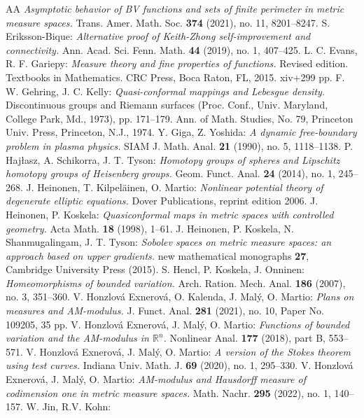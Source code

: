\documentclass[11pt, letterpaper]{amsart} %
\newcommand*{\R}{{\mathbb R}}
\numberwithin{equation}{section}
\theoremstyle{plain}
\theoremstyle{definition}
\begin{document}
{\begin{thebibliography}{AA}
\emph{Asymptotic behavior of BV functions and sets of finite perimeter in metric measure spaces.}
Trans. Amer. Math. Soc. {\bf 374} (2021), no. 11, 8201--8247.
 S. Eriksson-Bique:
\emph{Alternative proof of Keith-Zhong self-improvement and connectivity.}
Ann. Acad. Sci. Fenn. Math. {\bf 44} (2019), no. 1, 407--425.
 L. C. Evans, R. F. Gariepy:
\emph{Measure theory and fine properties of functions.}
Revised edition. Textbooks in Mathematics. CRC Press, Boca Raton, FL, 2015. xiv+299 pp.
 F. W. Gehring, J. C. Kelly:
\emph{Quasi-conformal mappings and Lebesgue density.}
Discontinuous groups and Riemann surfaces (Proc. Conf., Univ. Maryland, College Park, Md., 1973), pp. 171--179.
Ann. of Math. Studies, No. 79, Princeton Univ. Press, Princeton, N.J., 1974. 
 Y. Giga, Z. Yoshida:
\emph{A dynamic free-boundary problem in plasma physics.}
SIAM J. Math. Anal. {\bf 21} (1990), no. 5, 1118--1138. 
 P. Haj\l asz, A. Schikorra, J. T. Tyson:
\emph{Homotopy groups of spheres and Lipschitz homotopy groups of Heisenberg groups.}
Geom. Funct. Anal. {\bf 24} (2014), no. 1, 245--268. 
 J. Heinonen, T. Kilpel\"ainen, O. Martio:
\emph{Nonlinear potential theory of degenerate elliptic equations.}
Dover Publications, reprint edition 2006.
 J. Heinonen, P. Koskela:
\emph{Quasiconformal maps in metric spaces with controlled geometry.}
Acta Math. {\bf 18} (1998), 1--61.
 J. Heinonen, P. Koskela, N. Shanmugalingam, J. T. Tyson:
\emph{Sobolev spaces on metric measure spaces: an approach based on upper gradients.}
new mathematical monographs {\bf 27}, Cambridge University Press (2015).
 S. Hencl, P. Koskela, J. Onninen:
\emph{Homeomorphisms of bounded variation.}
Arch. Ration. Mech. Anal. {\bf 186} (2007), no. 3, 351--360.
 V. Honzlov\'a Exnerov\'a, O. Kalenda, J. Mal\'y, O. Martio:
\emph{Plans on measures and AM-modulus.}
J. Funct. Anal. {\bf 281} (2021), no. 10, Paper No. 109205, 35 pp.
 V. Honzlov\'a Exnerov\'a, J. Mal\'y, O. Martio:
\emph{Functions of bounded variation and the AM-modulus in $\R^n$.} 
Nonlinear Anal. {\bf 177} (2018), part B, 553--571.
 V. Honzlov\'a Exnerov\'a, J. Mal\'y, O. Martio:
\emph{A version of the Stokes theorem using test curves.}
Indiana Univ. Math. J. {\bf 69} (2020), no. 1, 295--330.
 V. Honzlov\'a Exnerov\'a, J. Mal\'y, O. Martio:
\emph{AM-modulus and Hausdorff measure of codimension one in metric measure spaces.}
Math. Nachr. {\bf 295} (2022), no. 1, 140--157.
 W. Jin, R.V.  Kohn:

\end{thebibliography}}
\end{document}

